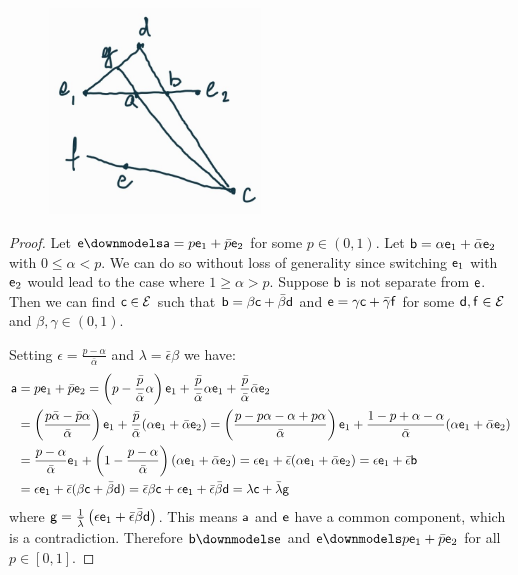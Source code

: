 \begin{figure}[h]
	\includegraphics[width=0.5\textwidth]{tempimages/DistinctAndMixture.jpg}
\end{figure}

\begin{proof}
	Let $\ens \separate \ens[a] = p \ens_1 + \bar{p} \ens_2$ for some $p \in (0, 1)$. Let $\ens[b] = \alpha \ens_1 + \bar{\alpha} \ens_2$ with $0 \leq \alpha < p$. We can do so without loss of generality since switching $\ens_1$ with $\ens_2$ would lead to the case where $1 \geq \alpha > p$. Suppose $\ens[b]$ is not separate from $\ens$. Then we can find $\ens[c] \in \Ens$ such that $\ens[b] = \beta \ens[c] + \bar{\beta} \ens[d]$ and $\ens = \gamma \ens[c] + \bar{\gamma} \ens[f]$ for some $\ens[d], \ens[f] \in \Ens$ and $\beta, \gamma \in (0, 1)$.
	
	Setting $\epsilon = \frac{p - \alpha}{\bar{\alpha}}$ and $\lambda = \bar{\epsilon} \beta$ we have:
	\begin{align*}
		\ens[a] &= p \ens_1 + \bar{p} \ens_2 = \left(p - \frac{\bar{p}}{\bar{\alpha}} \alpha \right) \ens_1 + \frac{\bar{p}}{\bar{\alpha}} \alpha \ens_1 + \frac{\bar{p}}{\bar{\alpha}} \bar{\alpha}\ens_2 \\
		&= \left(\frac{p\bar{\alpha} - \bar{p}\alpha}{\bar{\alpha}} \right) \ens_1 + \frac{\bar{p}}{\bar{\alpha}} (\alpha \ens_1 + \bar{\alpha} \ens_2) = \left(\frac{p - p\alpha - \alpha + p \alpha}{\bar{\alpha}} \right) \ens_1 + \frac{1 - p + \alpha - \alpha}{\bar{\alpha}} (\alpha \ens_1 + \bar{\alpha} \ens_2) \\
		&= \frac{p - \alpha}{\bar{\alpha}}  \ens_1 + \left( 1 - \frac{p - \alpha}{\bar{\alpha}}\right) (\alpha \ens_1 + \bar{\alpha} \ens_2) = \epsilon \ens_1 + \bar{\epsilon} (\alpha \ens_1 + \bar{\alpha} \ens_2) = \epsilon \ens_1 + \bar{\epsilon} \ens[b] \\
		&= \epsilon \ens_1 + \bar{\epsilon} ( \beta \ens[c] + \bar{\beta} \ens[d] ) = \bar{\epsilon} \beta \ens[c] + \epsilon \ens_1 + \bar{\epsilon} \bar{\beta} \ens[d] = \lambda \ens[c] + \bar{\lambda} \ens[g]
	\end{align*}
	where $\ens[g] = \frac{1}{\bar{\lambda}}\left( \epsilon \ens_1 + \bar{\epsilon} \bar{\beta} \ens[d] \right)$. This means $\ens[a]$ and $\ens$ have a common component, which is a contradiction. Therefore $\ens[b] \separate \ens$ and $\ens \separate p \ens_1 + \bar{p} \ens_2$ for all $p \in [0, 1]$.
\end{proof}

